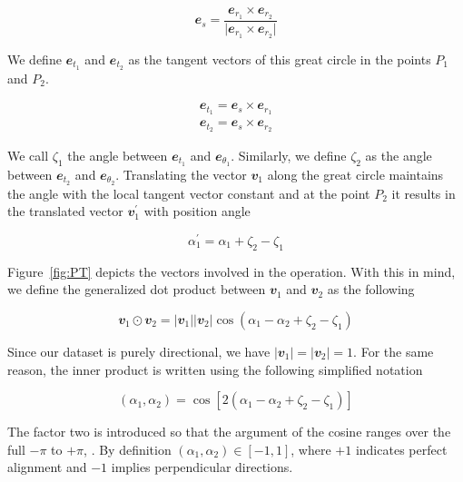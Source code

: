 		\begin{equation}
			\mathbfit{e}_s = \frac{\mathbfit{e}_{r_1}\times \mathbfit{e}_{r_2}}{\vert \mathbfit{e}_{r_1} \times \mathbfit{e}_{r_2}\vert}
		\end{equation}
		
		We define $\mathbfit{e}_{t_1}$ and $\mathbfit{e}_{t_2}$ as the tangent vectors of this great circle in the points $P_1$ and $P_2$.
		
		\begin{gather}
			\mathbfit{e}_{t_1} = \mathbfit{e}_{s} \times \mathbfit{e}_{r_1}
			\\
			\mathbfit{e}_{t_2} = \mathbfit{e}_{s} \times \mathbfit{e}_{r_2}
		\end{gather}
		
		We call $\zeta_1$ the angle between $\mathbfit{e}_{t_1}$ and $\mathbfit{e}_{\theta_1}$. Similarly, we define $\zeta_2$ as the angle between $\mathbfit{e}_{t_2}$ and $\mathbfit{e}_{\theta_2}$. Translating the vector $\mathbfit{v}_{1}$ along the great circle maintains the angle with the local tangent vector constant and at the point $P_2$ it results in the translated vector $\mathbfit{v}_1^\prime$ with position angle
		
		\begin{equation}
			\alpha_1^\prime =  \alpha_1 + \zeta_2 - \zeta_1
			\label{eq:alphaprime}
		\end{equation}
		
		Figure~\ref{fig:PT} depicts the vectors involved in the operation. With this in mind, we define the generalized dot product between $\mathbfit{v}_{1}$ and $\mathbfit{v}_{2}$ as the following
		
		\begin{equation}
			\mathbfit{v}_{1} \odot \mathbfit{v}_{2} = \vert \mathbfit{v}_{1} \vert
			\vert \mathbfit{v}_{2} \vert \cos (\alpha_1 - \alpha_2 + \zeta_2 - \zeta_1)
		\end{equation}
		
		Since our dataset is purely directional, we have $\vert \mathbfit{v}_{1} \vert = \vert \mathbfit{v}_{2} \vert = 1$. For the same reason, the inner product is written using the following simplified notation
		
		\begin{equation}
		(\alpha_1, \alpha_2) =  \cos [2(\alpha_1 - \alpha_2 + \zeta_2 - \zeta_1)]
		\label{eq:innerproduct}
		\end{equation}
		
		The factor two is introduced so that the argument of the cosine ranges over the full $-\pi$ to $+\pi$, \citep{Bietenholz1986}. By definition $(\alpha_1, \alpha_2) \in [-1, 1]$, where $+1$ indicates perfect alignment \citep{Jain2004} and $-1$ implies perpendicular directions.
		
